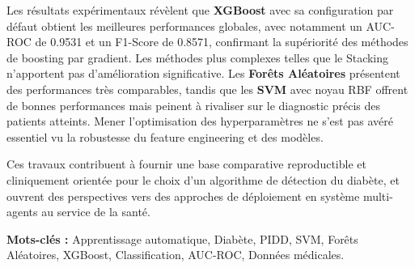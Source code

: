 Les résultats expérimentaux révèlent que \textbf{XGBoost} avec sa configuration par 
défaut obtient les meilleures performances globales, avec notamment un AUC-ROC de 
0.9531 et un F1-Score de 0.8571, confirmant la supériorité des méthodes de boosting 
par gradient. Les méthodes plus complexes telles que le Stacking n'apportent pas d'amélioration 
significative. Les \textbf{Forêts Aléatoires} présentent des performances très comparables,
tandis que les \textbf{SVM} avec noyau RBF offrent de bonnes performances mais peinent
à rivaliser sur le diagnostic précis des patients atteints. Mener l'optimisation des hyperparamètres 
ne s'est pas avéré essentiel vu la robustesse du feature engineering et des modèles.

Ces travaux contribuent à fournir une base comparative reproductible et cliniquement orientée
pour le choix d'un algorithme de détection du diabète, et ouvrent des perspectives vers des
approches de déploiement en système multi-agents au service de la santé.

\medskip
\noindent\textbf{Mots-clés :} Apprentissage automatique, Diabète, PIDD, SVM, Forêts
Aléatoires, XGBoost, Classification, AUC-ROC, Données médicales.